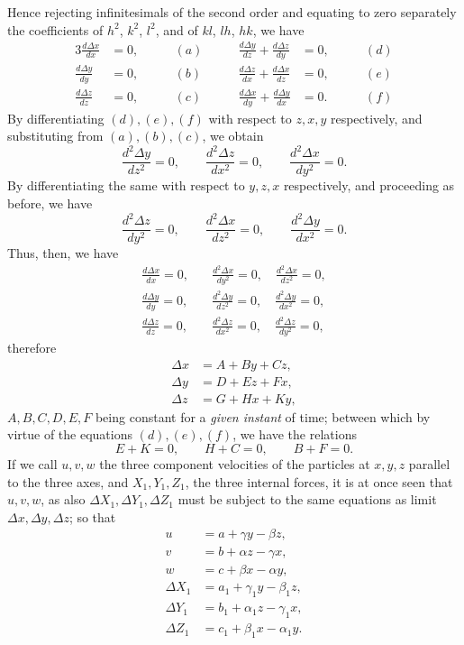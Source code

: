 \documentclass[11pt]{article}
\newcommand{\sourcepage}[1]{\marginpar{\scriptsize p.~#1}}
\newcommand{\tagtext}[1]{\tag{#1}}
\begin{document}
\sourcepage{34}
Hence rejecting infinitesimals of the second order and equating to zero separately the coefficients of $h^2$, $k^2$, $l^2$, and of $kl$, $lh$, $hk$, we have
\begin{alignat*}{3}
\frac{d\Delta x}{dx}&=0,\qquad &(a)\qquad&
\frac{d\Delta y}{dz}+\frac{d\Delta z}{dy}&=0,\qquad &(d)\\
\frac{d\Delta y}{dy}&=0, &(b)&
\frac{d\Delta z}{dx}+\frac{d\Delta x}{dz}&=0, &(e)\\
\frac{d\Delta z}{dz}&=0, &(c)&
\frac{d\Delta x}{dy}+\frac{d\Delta y}{dx}&=0. &(f)
\end{alignat*}
By differentiating $(d),(e),(f)$ with respect to $z,x,y$ respectively, and substituting from $(a),(b),(c)$, we obtain
\[
\frac{d^2\Delta y}{dz^2}=0,\qquad \frac{d^2\Delta z}{dx^2}=0,\qquad \frac{d^2\Delta x}{dy^2}=0.
\]
By differentiating the same with respect to $y,z,x$ respectively, and proceeding as before, we have
\[
\frac{d^2\Delta z}{dy^2}=0,\qquad \frac{d^2\Delta x}{dz^2}=0,\qquad \frac{d^2\Delta y}{dx^2}=0.
\]
Thus, then, we have
\begin{align*}
\frac{d\Delta x}{dx}=0,\quad &\frac{d^2\Delta x}{dy^2}=0,\quad \frac{d^2\Delta x}{dz^2}=0,\\
\frac{d\Delta y}{dy}=0,\quad &\frac{d^2\Delta y}{dz^2}=0,\quad \frac{d^2\Delta y}{dx^2}=0,\\
\frac{d\Delta z}{dz}=0,\quad &\frac{d^2\Delta z}{dx^2}=0,\quad \frac{d^2\Delta z}{dy^2}=0,
\end{align*}
therefore
\begin{align}
\Delta x&=A+By+Cz, \tagtext{$o$}\\
\Delta y&=D+Ez+Fx, \tagtext{$p$}\\
\Delta z&=G+Hx+Ky, \tagtext{$q$}
\end{align}
$A,B,C,D,E,F$ being constant for a \emph{given instant} of time; between which by virtue of the equations $(d),(e),(f)$, we have the relations
\[
E+K=0,\qquad H+C=0,\qquad B+F=0.
\]
If we call $u,v,w$ the three component velocities of the particles at $x,y,z$ parallel to the three axes, and $X_1,Y_1,Z_1$, the three internal forces, it is at once seen that $u,v,w$, as also $\Delta X_1,\Delta Y_1,\Delta Z_1$ must be subject to the same equations as limit $\Delta x,\Delta y,\Delta z$; so that
\begin{align}
u&=a+\gamma y-\beta z, \tag{1}\\
v&=b+\alpha z-\gamma x, \tag{2}\\
w&=c+\beta x-\alpha y, \tag{3}\\
\Delta X_1&=a_1+\gamma_1 y-\beta_1 z, \tagtext{$h$}\\
\Delta Y_1&=b_1+\alpha_1 z-\gamma_1 x, \tagtext{$j$}\\
\Delta Z_1&=c_1+\beta_1 x-\alpha_1 y. \tagtext{$k$}
\end{align}
\end{document}
